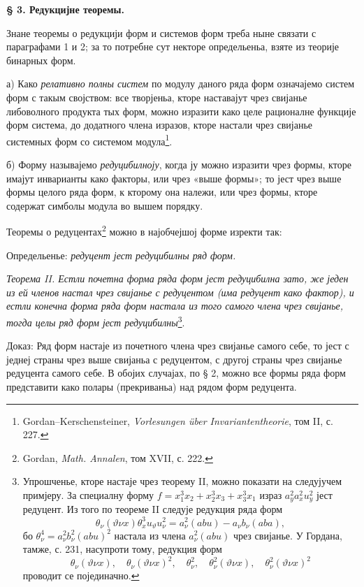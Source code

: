 ﻿\documentclass[11pt]{article}
\begin{document}
\begin{center}
\textbf{§ 3. \quad Редукцијне теоремы.}
\end{center}

Знане теоремы о редукцији форм и системов форм треба ныне связати с параграфами 1 и 2; за то потребне сут некторе определьеньа, взяте из теорије бинарных форм.

а) Како {\itshape релативно полны систем} по модулу даного ряда форм означајемо систем форм с такым својством: все творјеньа, кторе наставајут чрез свијанье либоволного продукта тых форм, можно изразити како целе рационалне функције форм система, до додатного члена изразов, кторе настали чрез свијанье системных форм со системом модула\footnote{Gordan--Kerschensteiner, \emph{Vorlesungen über Invariantentheorie}, том II, с. 227.}.

б) Форму называјемо {\itshape редуцибилноју}, когда ју можно изразити чрез формы, кторе имајут инварианты како факторы, или чрез «выше формы»; то јест чрез выше формы целого ряда форм, к кторому она належи, или чрез формы, кторе содержат симболы модула во вышем порядку.

Теоремы о редуцентах\footnote{Gordan, \emph{Math. Annalen}, том XVII, с. 222.} можно в најобчејшој форме изректи так:

Определьенье: {\itshape редуцент јест редуцибилны ряд форм.}

{\itshape Теорема II. Естли почетна форма ряда форм јест редуцибилна зато, же једен из ей членов настал чрез свијанье с редуцентом (има редуцент како фактор), и естли конечна форма ряда форм настала из того самого члена чрез свијанье, тогда целы ряд форм јест редуцибилны}\footnote{Упрошченье, кторе настаје чрез теорему II, можно показати на следујучем примјеру. За специалну форму $f=x_1^3x_2+x_2^3x_3+x_3^3x_1$ израз $a_y^2a_x^2u_y^2$ јест редуцент. Из того по теореме II следује редукция ряда форм
\[
\theta_\nu(\vartheta\nu x)\theta_x^3u_\vartheta u_\nu^2
=
a_\nu^2(abu)-a_\nu b_\nu(aba),
\]
бо $\theta_\nu^4=a_\nu^2b_\nu^2(abu)^2$ настала из члена $a_\nu^2(abu)$ чрез свијанье. У Гордана, тамже, с. 231, насупроти тому, редукция форм
\[
\theta_\nu(\vartheta\nu x),\quad \theta_\nu(\vartheta\nu x)^2,\quad
\theta_\nu^2,\quad \theta_\nu^2(\vartheta\nu x),\quad
\theta_\nu^2(\vartheta\nu x)^2
\]
проводит се појединачно.}.

Доказ: Ряд форм настаје из почетного члена чрез свијанье самого себе, то јест с једнеј страны чрез выше свијаньа с редуцентом, с другој страны чрез свијанье редуцента самого себе. В обојих случајах, по § 2, можно все формы ряда форм представити како полары (прекриваньа) над рядом форм редуцента.
\end{document}
